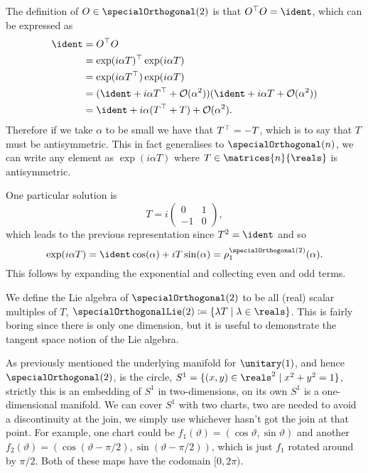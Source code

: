 The definition of \(O \in \specialOrthogonal(2)\) is that \(O^\trans O = \ident\), which can be expressed as
\begin{align}
    \ident &= O^\trans O\\
    &= \exp(i\alpha T)^{\trans} \exp(i\alpha T)\\
    &= \exp(i\alpha T^{\trans}) \exp(i\alpha T)\\
    &= (\ident + i\alpha T^{\trans} + \order(\alpha^2))(\ident + i\alpha T + \order(\alpha^2))\\
    &= \ident + i\alpha(T^\trans + T) + \order(\alpha^2).
\end{align}
Therefore if we take \(\alpha\) to be small we have that \(T^{\top} = -T\), which is to say that \(T\) must be antisymmetric.
This in fact generalises to \(\specialOrthogonal(n)\), we can write any element as \(\exp(i\alpha T)\) where \(T \in \matrices{n}{\reals}\) is antisymmetric.

One particular solution is
\begin{equation}
    T = i
    \begin{pmatrix}
        0 & 1\\
        -1 & 0
    \end{pmatrix}
    ,
\end{equation}
which leads to the previous representation since \(T^2 = \ident\) and so
\begin{equation}
    \exp(i\alpha T) = \ident \cos(\alpha) + iT\sin(\alpha) = \rho_1^{\specialOrthogonal(2)}(\alpha).
\end{equation}
This follows by expanding the exponential and collecting even and odd terms.

We define the Lie algebra of \(\specialOrthogonal(2)\) to be all (real) scalar multiples of \(T\), \(\specialOrthogonalLie(2) \coloneqq \{\lambda T \mid \lambda \in \reals\}\).
This is fairly boring since there is only one dimension, but it is useful to demonstrate the tangent space notion of the Lie algebra.

As previously mentioned the underlying manifold for \(\unitary(1)\), and hence \(\specialOrthogonal(2)\), is the circle, \(S^1 = \{(x, y) \in \reals^2 \mid x^2 + y^2 = 1\}\), strictly this is an embedding of \(S^1\) in two-dimensions, on its own \(S^1\) is a one-dimensional manifold.
We can cover \(S^1\) with two charts, two are needed to avoid a discontinuity at the join, we simply use whichever hasn't got the join at that point.
For example, one chart could be \(f_1(\vartheta) = (\cos\vartheta, \sin\vartheta)\) and another \(f_2(\vartheta) = (\cos(\vartheta - \pi/2), \sin(\vartheta - \pi/2))\), which is just \(f_1\) rotated around by \(\pi/2\).
Both of these maps have the codomain \([0, 2\pi)\).

